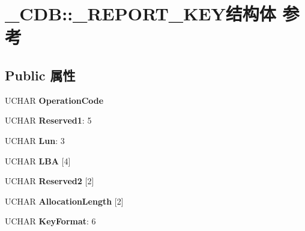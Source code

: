 \hypertarget{struct___c_d_b_1_1___r_e_p_o_r_t___k_e_y}{}\section{\+\_\+\+C\+DB\+:\+:\+\_\+\+R\+E\+P\+O\+R\+T\+\_\+\+K\+E\+Y结构体 参考}
\label{struct___c_d_b_1_1___r_e_p_o_r_t___k_e_y}
\subsection*{Public 属性}
\begin{DoxyCompactItemize}
\item 
\mbox{\label{struct___c_d_b_1_1___r_e_p_o_r_t___k_e_y_a3a890ce78c36da5fa7845952b6f25baa}} 
U\+C\+H\+AR {\bfseries Operation\+Code}
\item 
\mbox{\label{struct___c_d_b_1_1___r_e_p_o_r_t___k_e_y_af38fb45b8953048dc1d11e2f3c5aa9be}} 
U\+C\+H\+AR {\bfseries Reserved1}\+: 5
\item 
\mbox{\label{struct___c_d_b_1_1___r_e_p_o_r_t___k_e_y_a8425793e83bd779ef96431d5f8a2b4ea}} 
U\+C\+H\+AR {\bfseries Lun}\+: 3
\item 
\mbox{\label{struct___c_d_b_1_1___r_e_p_o_r_t___k_e_y_a578ffb9613e397121a1743c051d9e124}} 
U\+C\+H\+AR {\bfseries L\+BA} \mbox{[}4\mbox{]}
\item 
\mbox{\label{struct___c_d_b_1_1___r_e_p_o_r_t___k_e_y_ac9d2ebac582238b4c39fc628e0818f38}} 
U\+C\+H\+AR {\bfseries Reserved2} \mbox{[}2\mbox{]}
\item 
\mbox{\label{struct___c_d_b_1_1___r_e_p_o_r_t___k_e_y_ad620bcf35a4e2c242b4f42ed6e26fd74}} 
U\+C\+H\+AR {\bfseries Allocation\+Length} \mbox{[}2\mbox{]}
\item 
\mbox{\label{struct___c_d_b_1_1___r_e_p_o_r_t___k_e_y_a7845f7cda93801992e5f85fc9a6ad1eb}} 
U\+C\+H\+AR {\bfseries Key\+Format}\+: 6

\end{DoxyCompactItemize}
